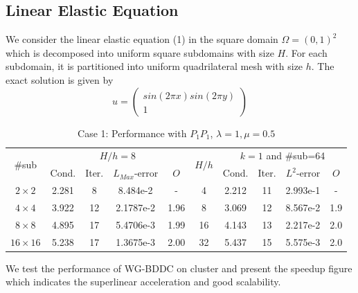 			
			\subsection{Linear Elastic Equation}
			
			We consider the linear elastic equation (1) in the square domain $ \Omega = (0, 1)^{2} $ which is decomposed into uniform square subdomains with size $ H $. For each subdomain, it is partitioned into uniform quadrilateral mesh with size $ h $. The exact solution is given by
			\begin{equation}
			u = \begin{pmatrix}
			sin(2\pi x)sin(2\pi y) \\ 1
			\end{pmatrix}
			\end{equation}
			
			\begin{table}[h]
				\small
				\vspace{-10pt}
				\setlength{\tabcolsep}{1pt} {
					\caption{Case 1: Performance with $P_{1}P_{1}$, $ \lambda = 1, \mu = 0.5 $}
					\label{Tab:case1_PkPkPk linear}
					\vspace{-5pt}
					\begin{center}
						\begin{tabular}{c|cccc|c|cccc}
							\hline
							\multirow{2}{*}{\#sub} &\multicolumn{4}{c|}{ $H/h=8$} &\multirow{2}{*}{$H/h$} &\multicolumn{4}{c}{$k=1$ and \#sub=64}\\ 
							& Cond.   & Iter. &$L_{Max}$-error & $O$& & Cond.   & Iter. &$L^2$-error & $O$ \\
							
							\hline
							$2\times 2$     & 2.281 & 8   & 8.484e-2 & - & 4   & 2.212 &11 & 2.993e-1 &- \\
							$4\times 4$     &3.922 &12 &2.1787e-2 & 1.96 & 8   & 3.069 &12 & 8.567e-2 & 1.9  \\
							$8\times 8$  & 4.895 &17 &5.4706e-3 & 1.99 & 16   & 4.143 &13 & 2.217e-2 & 2.0 \\
							$16\times 16$ &5.238&17 &1.3675e-3 & 2.00 & 32   & 5.437 &15 & 5.575e-3 & 2.0 \\
							\hline	
						\end{tabular}
					\end{center} }
				\end{table}
				
				We test the performance of WG-BDDC on cluster and present the speedup figure which indicates the superlinear acceleration and good scalability. 
				
